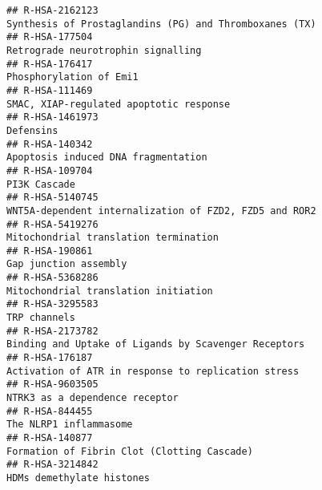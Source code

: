 \documentclass[
]{article}
\begin{document}
\begin{verbatim}
## R-HSA-2162123                                                                               Synthesis of Prostaglandins (PG) and Thromboxanes (TX)
## R-HSA-177504                                                                                                    Retrograde neurotrophin signalling
## R-HSA-176417                                                                                                               Phosphorylation of Emi1
## R-HSA-111469                                                                                               SMAC, XIAP-regulated apoptotic response
## R-HSA-1461973                                                                                                                            Defensins
## R-HSA-140342                                                                                                   Apoptosis induced DNA fragmentation
## R-HSA-109704                                                                                                                          PI3K Cascade
## R-HSA-5140745                                                                               WNT5A-dependent internalization of FZD2, FZD5 and ROR2
## R-HSA-5419276                                                                                                Mitochondrial translation termination
## R-HSA-190861                                                                                                                 Gap junction assembly
## R-HSA-5368286                                                                                                 Mitochondrial translation initiation
## R-HSA-3295583                                                                                                                         TRP channels
## R-HSA-2173782                                                                                 Binding and Uptake of Ligands by Scavenger Receptors
## R-HSA-176187                                                                                   Activation of ATR in response to replication stress
## R-HSA-9603505                                                                                                       NTRK3 as a dependence receptor
## R-HSA-844455                                                                                                                The NLRP1 inflammasome
## R-HSA-140877                                                                                           Formation of Fibrin Clot (Clotting Cascade)
## R-HSA-3214842                                                                                                            HDMs demethylate histones

\end{verbatim}
\end{document}

